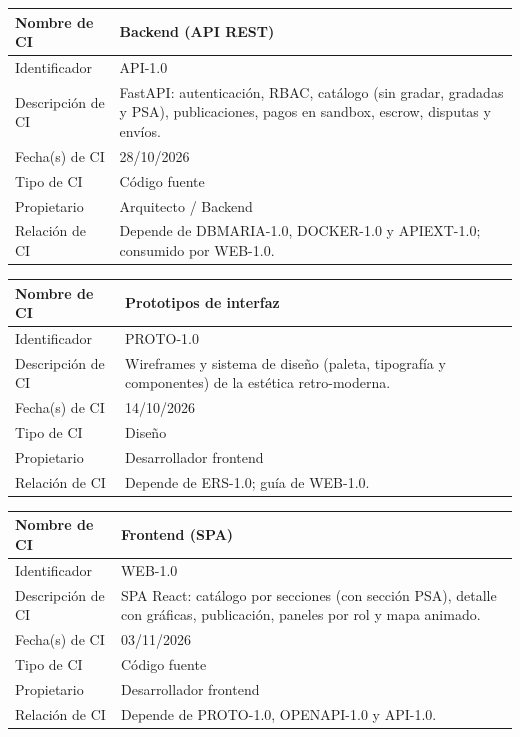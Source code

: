 \documentclass[letterpaper,11pt]{article}
\begin{document}
\noindent\begin{minipage}{\textwidth}
\small\renewcommand{\arraystretch}{1.9}
\begin{tabularx}{\textwidth}{|p{3.3cm}|Y|}
\hline
Nombre de CI & Backend (API REST) \\ \hline
Identificador & API-1.0 \\ \hline
Descripción de CI & FastAPI: autenticación, RBAC, catálogo (sin gradar, gradadas y PSA), publicaciones, pagos en sandbox, escrow, disputas y envíos. \\ \hline
Fecha(s) de CI & 28/10/2026 \\ \hline
Tipo de CI & Código fuente \\ \hline
Propietario & Arquitecto / Backend \\ \hline
Relación de CI & Depende de DBMARIA-1.0, DOCKER-1.0 y APIEXT-1.0; consumido por WEB-1.0. \\ \hline
\end{tabularx}
\end{minipage}\par\bigskip
\noindent\begin{minipage}{\textwidth}
\small\renewcommand{\arraystretch}{1.9}
\begin{tabularx}{\textwidth}{|p{3.3cm}|Y|}
\hline
Nombre de CI & Prototipos de interfaz \\ \hline
Identificador & PROTO-1.0 \\ \hline
Descripción de CI & Wireframes y sistema de diseño (paleta, tipografía y componentes) de la estética retro-moderna. \\ \hline
Fecha(s) de CI & 14/10/2026 \\ \hline
Tipo de CI & Diseño \\ \hline
Propietario & Desarrollador frontend \\ \hline
Relación de CI & Depende de ERS-1.0; guía de WEB-1.0. \\ \hline
\end{tabularx}
\end{minipage}\par\bigskip
\noindent\begin{minipage}{\textwidth}
\small\renewcommand{\arraystretch}{1.9}
\begin{tabularx}{\textwidth}{|p{3.3cm}|Y|}
\hline
Nombre de CI & Frontend (SPA) \\ \hline
Identificador & WEB-1.0 \\ \hline
Descripción de CI & SPA React: catálogo por secciones (con sección PSA), detalle con gráficas, publicación, paneles por rol y mapa animado. \\ \hline
Fecha(s) de CI & 03/11/2026 \\ \hline
Tipo de CI & Código fuente \\ \hline
Propietario & Desarrollador frontend \\ \hline
Relación de CI & Depende de PROTO-1.0, OPENAPI-1.0 y API-1.0. \\ \hline
\end{tabularx}
\end{minipage}\par\bigskip
\end{document}
